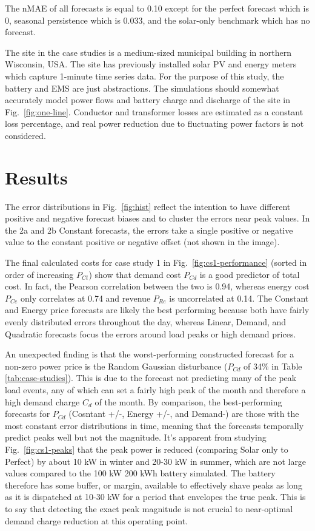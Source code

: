 \documentclass[conference]{IEEEtran}
\begin{document}
The nMAE of all forecasts is equal to 0.10 except for the perfect forecast which is 0, seasonal persistence which is 0.033, and the solar-only benchmark which has no forecast.

The site in the case studies is a medium-sized municipal building in northern Wisconsin, USA. The site has previously installed solar PV and energy meters which capture 1-minute time series data. For the purpose of this study, the battery and EMS are just abstractions. The simulations should somewhat accurately model power flows and battery charge and discharge of the site in Fig.~\ref{fig:one-line}. Conductor and transformer losses are estimated as a constant loss percentage, and real power reduction due to fluctuating power factors is not considered. 


\section{Results}

The error distributions in Fig.~\ref{fig:hist} reflect the intention to have different positive and negative forecast biases and to cluster the errors near peak values. In the 2a and 2b Constant forecasts, the errors take a single positive or negative value to the constant positive or negative offset (not shown in the image).

The final calculated costs for case study 1 in Fig.~\ref{fig:cs1-performance} (sorted in order of increasing $P_{Ct}$) show that demand cost $P_{Cd}$ is a good predictor of total cost. In fact, the Pearson correlation between the two is 0.94, whereas energy cost $P_{Ce}$ only correlates at 0.74 and revenue $P_{Re}$ is uncorrelated at 0.14. The Constant and Energy price forecasts are likely the best performing because both have fairly evenly distributed errors throughout the day, whereas Linear, Demand, and Quadratic forecasts focus the errors around load peaks or high demand prices.

An unexpected finding is that the worst-performing constructed forecast for a non-zero power price is the Random Gaussian disturbance ($P_{Cd}$ of 34\% in Table \ref{tab:case-studies}). This is due to the forecast not predicting many of the peak load events, any of which can set a fairly high peak of the month and therefore a high demand charge $C_d$ of the month. By comparison, the best-performing forecasts for $P_{Cd}$ (Cosntant +/-, Energy +/-, and Demand-) are those with the most constant error distributions in time, meaning that the forecasts temporally predict peaks well but not the magnitude. It's apparent from studying Fig.~\ref{fig:cs1-peaks} that the peak power is reduced (comparing Solar only to Perfect) by about 10 kW in winter and 20-30 kW in summer, which are not large values compared to the 100 kW 200 kWh battery simulated. The battery therefore has some buffer, or margin, available to effectively shave peaks as long as it is dispatched at 10-30 kW for a period that envelopes the true peak. This is to say that detecting the exact peak magnitude is not crucial to near-optimal demand charge reduction at this operating point. 
\end{document}

